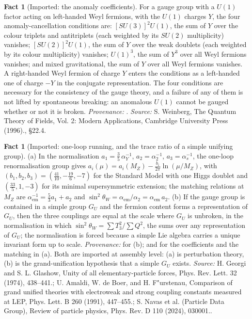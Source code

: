 \documentclass[11pt]{article}
\theoremstyle{definition}
\newtheorem{fact}[theorem]{Fact}
\theoremstyle{plain}
\begin{document}
\begin{fact}[Imported: the anomaly coefficients]\label{c:standard-model.imported-anomaly-coefficients}
For a gauge group with a $U(1)$ factor acting on left-handed Weyl fermions, with the $U(1)$ charges $Y$, the four anomaly-cancellation conditions are: $[SU(3)]^{2}U(1)$, the sum of $Y$ over the colour triplets and antitriplets (each weighted by its $SU(2)$ multiplicity) vanishes; $[SU(2)]^{2}U(1)$, the sum of $Y$ over the weak doublets (each weighted by its colour multiplicity) vanishes; $U(1)^{3}$, the sum of $Y^{3}$ over all Weyl fermions vanishes; and mixed gravitational, the sum of $Y$ over all Weyl fermions vanishes. A right-handed Weyl fermion of charge $Y$ enters the conditions as a left-handed one of charge $-Y$ in the conjugate representation. The four conditions are necessary for the consistency of the gauge theory, and a failure of any of them is not lifted by spontaneous breaking: an anomalous $U(1)$ cannot be gauged whether or not it is broken. \emph{Provenance:} \cite[\S 22.4]{WeinbergQFT2}.
\emph{Source:} S. Weinberg, The Quantum Theory of Fields, Vol. 2: Modern Applications, Cambridge University Press (1996)., \S 22.4.
\end{fact}

\begin{fact}[Imported: one-loop running, and the trace ratio of a simple unifying group]\label{c:standard-model.imported-one-loop-running-trace-ratio}
(a) In the normalisation $a_{1} = \tfrac35\,\alpha_{Y}^{-1}$, $a_{2} = \alpha_{2}^{-1}$, $a_{3} = \alpha_{s}^{-1}$, the one-loop renormalisation group gives $a_{i}(\mu) = a_{i}(M_{Z}) - \tfrac{b_{i}}{2\pi}\ln(\mu/M_{Z})$, with $(b_{1}, b_{2}, b_{3}) = (\tfrac{41}{10}, -\tfrac{19}{6}, -7)$ for the Standard Model with one Higgs doublet and $(\tfrac{33}{5}, 1, -3)$ for its minimal supersymmetric extension; the matching relations at $M_{Z}$ are $\alpha_{\mathrm{em}}^{-1} = \tfrac53 a_{1} + a_{2}$ and $\sin^{2}\theta_{W} = \alpha_{\mathrm{em}}/\alpha_{2} = \alpha_{\mathrm{em}}\,a_{2}$. (b) If the gauge group is contained in a simple group $G_{U}$ and the fermion content forms a representation of $G_{U}$, then the three couplings are equal at the scale where $G_{U}$ is unbroken, in the normalisation in which $\sin^{2}\theta_{W} = \sum T_{3}^{2}/\sum Q^{2}$, the sums over any representation of $G_{U}$; the normalisation is forced because a simple Lie algebra carries a unique invariant form up to scale. \emph{Provenance:} \cite{GeorgiGlashow1974} for (b); \cite{Amaldi1991} and \cite{PDG2024} for the coefficients and the matching in (a). Both are imported at assembly level: (a) is perturbation theory, (b) is the grand-unification hypothesis that a simple $G_{U}$ exists.
\emph{Source:} H. Georgi and S. L. Glashow, Unity of all elementary-particle forces, Phys. Rev. Lett. 32 (1974), 438--441.; U. Amaldi, W. de Boer, and H. F"urstenau, Comparison of grand unified theories with electroweak and strong coupling constants measured at LEP, Phys. Lett. B 260 (1991), 447--455.; S. Navas et al. (Particle Data Group), Review of particle physics, Phys. Rev. D 110 (2024), 030001..
\end{fact}
\end{document}
